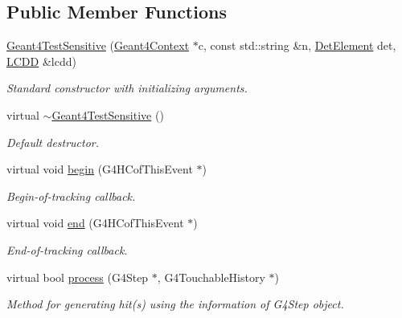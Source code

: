 \subsection*{Public Member Functions}
\begin{DoxyCompactItemize}
\item 
\hyperlink{class_d_d4hep_1_1_simulation_1_1_test_1_1_geant4_test_sensitive_ad25fb0c90df85ec1ad12ab7dc4311fcc}{Geant4TestSensitive} (\hyperlink{class_d_d4hep_1_1_simulation_1_1_geant4_context}{Geant4Context} $\ast$c, const std::string \&n, \hyperlink{class_d_d4hep_1_1_geometry_1_1_det_element}{DetElement} det, \hyperlink{class_d_d4hep_1_1_geometry_1_1_l_c_d_d}{LCDD} \&lcdd)
\begin{DoxyCompactList}\small\item\em Standard constructor with initializing arguments. \item\end{DoxyCompactList}\item 
virtual \hyperlink{class_d_d4hep_1_1_simulation_1_1_test_1_1_geant4_test_sensitive_a0f7b16af79f07274792ef1690a45d93c}{$\sim$Geant4TestSensitive} ()
\begin{DoxyCompactList}\small\item\em Default destructor. \item\end{DoxyCompactList}\item 
virtual void \hyperlink{class_d_d4hep_1_1_simulation_1_1_test_1_1_geant4_test_sensitive_a7d7593372b9bfcc1e1a3f21ceef841d8}{begin} (G4HCofThisEvent $\ast$)
\begin{DoxyCompactList}\small\item\em Begin-\/of-\/tracking callback. \item\end{DoxyCompactList}\item 
virtual void \hyperlink{class_d_d4hep_1_1_simulation_1_1_test_1_1_geant4_test_sensitive_accc5a2ae9369d9847ac25a01b55e6350}{end} (G4HCofThisEvent $\ast$)
\begin{DoxyCompactList}\small\item\em End-\/of-\/tracking callback. \item\end{DoxyCompactList}\item 
virtual bool \hyperlink{class_d_d4hep_1_1_simulation_1_1_test_1_1_geant4_test_sensitive_aa5d824cbc3f5bfdd8e03236c8aec07ed}{process} (G4Step $\ast$, G4TouchableHistory $\ast$)
\begin{DoxyCompactList}\small\item\em Method for generating hit(s) using the information of G4Step object. \item\end{DoxyCompactList}\end{DoxyCompactItemize}
